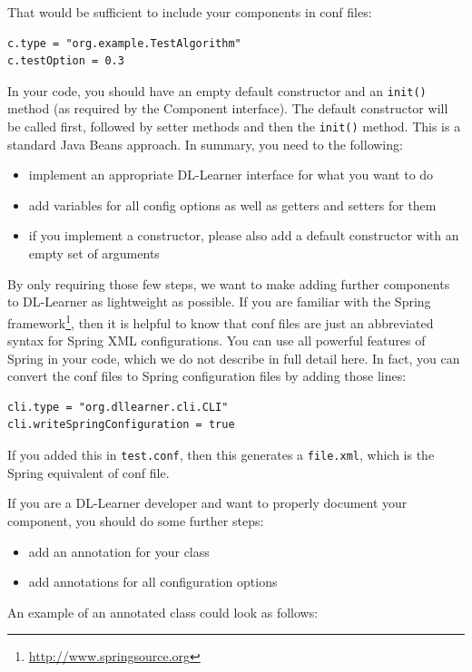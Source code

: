 \documentclass[a4paper,12pt]{scrartcl}
\begin{document}
That would be sufficient to include your components in conf files:
\begin{verbatim}
c.type = "org.example.TestAlgorithm"
c.testOption = 0.3
\end{verbatim}

In your code, you should have an empty default constructor and an \verb|init()| method (as required by the Component interface). The default constructor will be called first, followed by setter methods and then the \verb|init()| method. This is a standard Java Beans approach. In summary, you need to the following:
\begin{itemize}
	\item implement an appropriate DL-Learner interface for what you want to do
	\item add variables for all config options as well as getters and setters for them
	\item if you implement a constructor, please also add a default constructor with an empty set of arguments
\end{itemize}

By only requiring those few steps, we want to make adding further components to DL-Learner as lightweight as possible.
If you are familiar with the Spring framework\footnote{\url{http://www.springsource.org}}, then it is helpful to know that conf files are just an abbreviated syntax for Spring XML configurations. You can use all powerful features of Spring in your code, which we do not describe in full detail here. In fact, you can convert the conf files to Spring configuration files by adding those lines:

\begin{verbatim}
cli.type = "org.dllearner.cli.CLI"
cli.writeSpringConfiguration = true
\end{verbatim}

If you added this in \verb|test.conf|, then this generates a \verb|file.xml|, which is the Spring equivalent of conf file.

If you are a DL-Learner developer and want to properly document your component, you should do some further steps:
\begin{itemize}
	\item add an annotation for your class
	\item add annotations for all configuration options
\end{itemize}

An example of an annotated class could look as follows:
\end{document}
